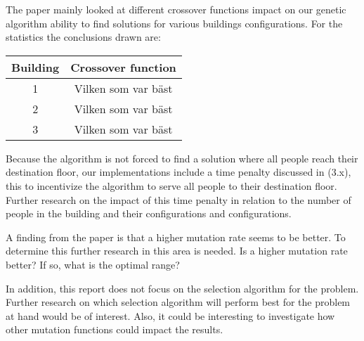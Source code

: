
The paper mainly looked at different crossover functions impact on our genetic algorithm ability to find solutions for various buildings configurations. For the statistics the conclusions drawn are:

\begin{center}
	\begin{tabular}{|c|c|}
		\hline
		Building & Crossover function  \\ \hline
		1        & Vilken som var bäst \\ \hline
		2        & Vilken som var bäst \\ \hline
		3        & Vilken som var bäst \\ \hline
	\end{tabular}
\end{center}
Because the algorithm is not forced to find a solution where all people reach their destination floor, our implementations include a time penalty discussed in (3.x), this to incentivize the algorithm to serve all people to their destination floor. Further research on the impact of this time penalty in relation to the number of people in the building and their configurations and configurations.

A finding from the paper is that a higher mutation rate seems to be better. To determine this further research in this area is needed. Is a higher mutation rate better? If so, what is the optimal range?

In addition, this report does not focus on the selection algorithm for the problem. Further research on which selection algorithm will perform best for the problem at hand would be of interest. Also, it could be interesting to investigate how other mutation functions could impact the results.